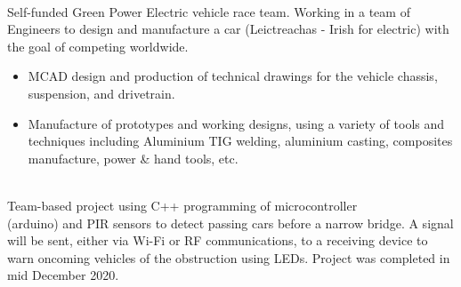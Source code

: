 \documentclass[10pt,a4paper,ragged2e,withhyper]{altacv}
\begin{document}
\begin{paracol}{2}



 \\
Self-funded Green Power Electric vehicle race team. Working in a team of Engineers to design and manufacture a car (Leictreachas - Irish for electric) with the goal of competing worldwide.
\begin{itemize}
\item MCAD design and production of technical drawings for the vehicle chassis, suspension, and drivetrain.
\item Manufacture of prototypes and working designs, using a variety of tools and techniques including Aluminium TIG welding, aluminium casting, composites manufacture, power \& hand tools, etc.
\end{itemize}

\divider

\\
Team-based project using C++ programming of microcontroller \\(arduino) and PIR sensors to detect passing cars before a narrow bridge. A signal will be sent, either via Wi-Fi or RF communications, to a receiving device to warn oncoming vehicles of the obstruction using LEDs. Project was completed in mid December 2020.

\divider




\switchcolumn


 \\ {}


\end{paracol}
\end{document}
